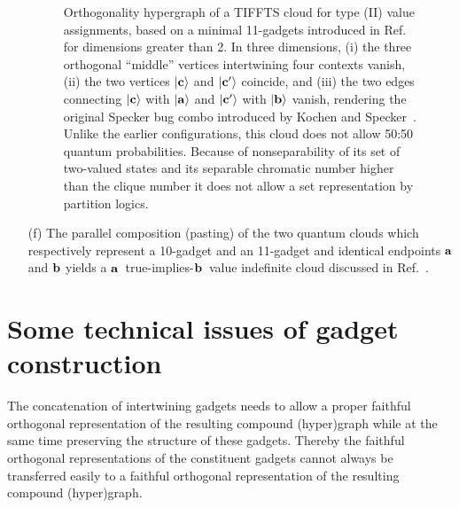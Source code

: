 \documentclass[%
  reprint,
  twocolumn,
 showpacs,
 showkeys,
 preprintnumbers,
 amsmath,amssymb,
 aps,
  prl,
  longbibliography,
 ]{revtex4-1}
\begin{document}
\begin{enumerate}
\begin{figure}
\begin{center}
\begin{tikzpicture}  [scale=0.8, rotate= 0]
\end{tikzpicture}
\end{center}
\caption{
\label{2018-c-f-TIFFTS}
Orthogonality hypergraph of a TIFFTS cloud for type (II) value assignments,
based on a minimal 11-gadgets introduced in Ref.~\cite[Fig.~6]{2018-minimalYIYS} for dimensions greater than 2.
In three dimensions,
(i) the three orthogonal ``middle'' vertices intertwining four contexts vanish,
(ii) the two vertices $\vert {\bf c}\rangle$ and $\vert {\bf c}'\rangle$  coincide, and
(iii) the two edges connecting $\vert {\bf c}\rangle$ with $\vert {\bf a}\rangle$  and $\vert {\bf c}'\rangle$
with $\vert {\bf b}\rangle$ vanish,
rendering the original Specker bug combo introduced by Kochen and Specker~\cite[$\Gamma_3$, p.~70]{kochen1}.
Unlike the earlier configurations, this cloud does not allow 50:50 quantum probabilities.
Because of nonseparability of its set of two-valued states
and its separable chromatic number higher than the clique number
it does not allow a set representation by partition logics.
}
\end{figure}

\item[(f)]
The parallel composition (pasting) of the two quantum clouds which respectively represent a 10-gadget and an 11-gadget
and identical endpoints   ${\bf a}$ and ${\bf b}$ yields a ${\bf a}$~true-implies-${\bf b}$~value indefinite cloud discussed in Ref.~\cite{2015-AnalyticKS}.

\end{enumerate}


\section{Some technical issues of gadget construction}

The concatenation of intertwining gadgets needs to allow a proper faithful orthogonal representation
of the resulting compound (hyper)graph while at the same time preserving the structure of these gadgets.
Thereby the faithful orthogonal representations of the constituent gadgets cannot always be transferred
easily to a faithful orthogonal representation of the resulting compound (hyper)graph.
\end{document}
